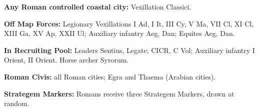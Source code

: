 \textbf{Any Roman controlled coastal city:} Vexillation Classici.

\textbf{Off Map Forces:} Legionary Vexillations I Ad, I It, III Cy, V Ma, VII Cl, XI Cl, XIII Ga, XV Ap, XXII Ul; Auxiliary infantry Aeg, Dan; Equites Aeg, Dan.

\textbf{In Recruiting Pool:} Leaders Sentius, Legate; CICR, C Vol; Auxiliary infantry I Orient, II Orient. Horse archer Syrorum.

\textbf{Roman Civis:} all Roman cities; Egra and Thaema (Arabian cities).

\textbf{Strategem Markers:} Romans receive three Strategem Markers, drawn at random.

